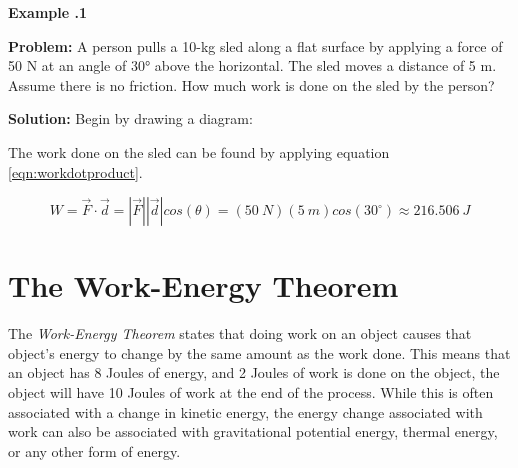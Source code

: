 	\begin{mdframed}[backgroundcolor=blue!10!white]
	\begin{center}
		
		
		\textbf{Example \thesection.1}	
	\end{center}
	
	\textbf{Problem: } A person pulls a 10-kg sled along a flat surface by applying a force of 50 N at an angle of 30° above the horizontal. The sled moves a distance of 5 m. Assume there is no friction. How much work is done on the sled by the person?

	\vspace{0.1in}
	
	\textbf{Solution:} 
	Begin by drawing a diagram:
	\vspace{0.1in}
	\begin{center}


		
		
	\end{center}
	
The work done on the sled can be found by applying equation \ref{eqn:workdotproduct}.


		\begin{equation*}
		W = \vec{F}\cdot\vec{d}  = |\vec{F}| |\vec{d}| cos (\theta) = (\SI{50}{N})(\SI{5}{m})cos(30 ^\circ) \approx \SI{216.506}{J}
	\end{equation*}
	
	
	
	
	
\end{mdframed}

	
	\section{The Work-Energy Theorem}
	The \textit{Work-Energy Theorem} states that doing work on an object causes that object's energy to change by the same amount as the work done.  This means that an object has 8 Joules of energy, and 2 Joules of work is done on the object, the object will have 10 Joules of work at the end of the process.  	While this is often associated with a change in kinetic energy, the energy change associated with work can also be associated with gravitational potential energy, thermal energy, or any other form of energy.  
	
